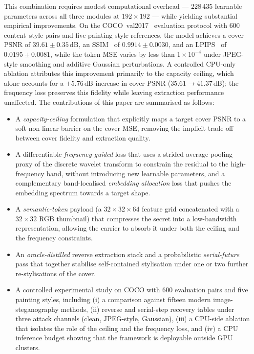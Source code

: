 \documentclass[runningheads]{llncs}
\begin{document}
This combination requires modest computational overhead --- $228\,435$ learnable parameters across all three modules at $192\!\times\!192$ --- while yielding substantial empirical improvements. On the COCO~val2017~\cite{coco} evaluation protocol with $600$ content--style pairs and five painting-style references, the model achieves a cover PSNR of $39.61\pm0.35$\,dB, an SSIM~\cite{ssim} of $0.9914\pm0.0030$, and an LPIPS~\cite{lpips} of $0.0195\pm0.0081$, while the token MSE varies by less than $1\times10^{-4}$ under JPEG-style smoothing and additive Gaussian perturbations. A controlled CPU-only ablation attributes this improvement primarily to the capacity ceiling, which alone accounts for a $+5.76$\,dB increase in cover PSNR ($35.61\to41.37$\,dB); the frequency loss preserves this fidelity while leaving extraction performance unaffected. The contributions of this paper are summarised as follows:
\begin{itemize}
    \item A \emph{capacity-ceiling} formulation that explicitly maps a target cover PSNR to a soft non-linear barrier on the cover MSE, removing the implicit trade-off between cover fidelity and extraction quality.
    \item A differentiable \emph{frequency-guided} loss that uses a strided average-pooling proxy of the discrete wavelet transform to constrain the residual to the high-frequency band, without introducing new learnable parameters, and a complementary band-localised \emph{embedding allocation} loss that pushes the embedding spectrum towards a target shape.
    \item A \emph{semantic-token} payload (a $32\!\times\!32\!\times\!64$ feature grid concatenated with a $32\!\times\!32$ RGB thumbnail) that compresses the secret into a low-bandwidth representation, allowing the carrier to absorb it under both the ceiling and the frequency constraints.
    \item An \emph{oracle-distilled} reverse extraction stack and a probabilistic \emph{serial-future} pass that together stabilise self-contained stylisation under one or two further re-stylisations of the cover.
    \item A controlled experimental study on COCO with $600$ evaluation pairs and five painting styles, including (i) a comparison against fifteen modern image-steganography methods, (ii) reverse and serial-step recovery tables under three attack channels (clean, JPEG-style, Gaussian), (iii) a CPU-side ablation that isolates the role of the ceiling and the frequency loss, and (iv) a CPU inference budget showing that the framework is deployable outside GPU clusters.
\end{itemize}
\end{document}
